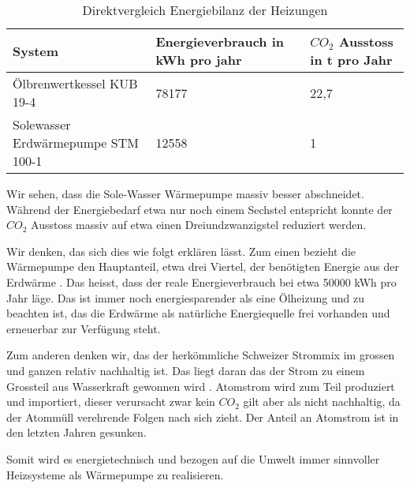 \begin{table}
\begin{center}
\begin{tabular}{|l|l|l|}

\hline
  System   & Energieverbrauch in kWh pro jahr & $CO_2$ Ausstoss in t pro Jahr\\
\hline
 Ölbrenwertkessel KUB 19-4           & 78177 & 22,7 \\
\hline
 Solewasser Erdwärmepumpe STM 100-1  & 12558 & 1     \\
\hline
\end{tabular}
\end{center}
\label{bilanz:vergleich}
\caption{Direktvergleich Energiebilanz der Heizungen}
\end{table}

Wir sehen, dass die Sole-Wasser Wärmepumpe massiv besser abschneidet.
Während der Energiebedarf etwa nur noch einem Sechstel entspricht konnte
der $CO_2$ Ausstoss massiv auf etwa einen Dreiundzwanzigstel reduziert werden.

Wir denken, das sich dies wie folgt erklären lässt.
Zum einen bezieht die Wärmepumpe den Hauptanteil, etwa drei Viertel, der benötigten Energie
aus der Erdwärme \cite{junkers:funktionwarmepumpe}.
Das heisst, dass der reale Energieverbrauch bei etwa 50000 kWh pro Jahr läge. Das ist immer noch energiesparender als eine Ölheizung und zu beachten ist, das die Erdwärme als natürliche Energiequelle frei vorhanden und erneuerbar zur Verfügung steht.

Zum anderen denken wir, das der herkömmliche Schweizer Strommix im grossen und
ganzen relativ nachhaltig ist. Das liegt daran das der Strom zu einem Grossteil
aus Wasserkraft gewonnen wird \cite{bafu:strommix}.
Atomstrom wird zum Teil produziert und importiert, dieser verursacht zwar kein
$CO_2$ gilt aber als nicht nachhaltig, da der Atommüll verehrende Folgen
nach sich zieht.
Der Anteil an Atomstrom ist in den letzten Jahren gesunken.

Somit wird es energietechnisch und bezogen auf die Umwelt immer sinnvoller
Heizsysteme als Wärmepumpe zu realisieren.
